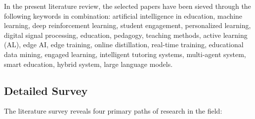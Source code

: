 \documentclass[conference]{IEEEtran}
\begin{document}
In the present literature review, the selected papers have been sieved through the following keywords in combination: artificial intelligence in education, machine learning, deep reinforcement learning, student engagement, personalized learning, digital signal processing, education, pedagogy, teaching methods, active learning (AL), edge AI, edge training, online distillation, real-time training, educational data mining, engaged learning, intelligent tutoring systems, multi-agent system, smart education, hybrid system, large language models.

\subsection{Detailed Survey}


The literature survey reveals four primary paths of research in the field:
\end{document}
